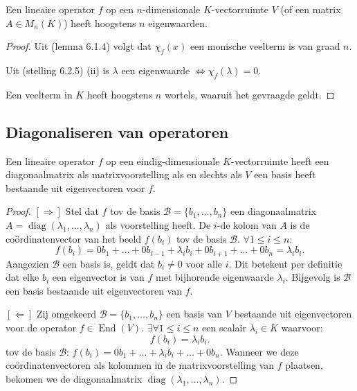 \begin{gevolg}[6.2.6]
    Een lineaire operator $f$ op een $n$-dimensionale $K$-vectorruimte $V$ (of een matrix $A \in M_n(K)$) heeft hoogstens $n$ eigenwaarden.
\end{gevolg}
\begin{proof}
    Uit (lemma 6.1.4) volgt dat \(\chi_f(x)\) een monische veelterm is van graad \(n\).

    Uit (stelling 6.2.5) (ii) is \(\lambda\) een eigenwaarde  
    \(\iff \chi_f(\lambda) = 0. \)

    Een veelterm in \(K\) heeft hoogstens \(n\) wortels, waaruit het gevraagde geldt. 

\end{proof}

\subsection{Diagonaliseren van operatoren}

\begin{stelling}[6.3.1]
    Een lineaire operator $f$ op een eindig-dimensionale $K$-vectorruimte heeft een diagonaalmatrix als matrixvoorstelling als en slechts als $V$ een basis heeft bestaande uit eigenvectoren voor $f$.
\end{stelling}
\begin{proof}
    $[\Rightarrow]$ Stel dat $f$ tov de basis $\mathcal{B} = \{b_1, \dots, b_n\}$ een diagonaalmatrix $A = \operatorname{diag}(\lambda_1, \dots, \lambda_n)$ als voorstelling heeft.
     De $i$-de kolom van $A$ is de coördinatenvector van het beeld $f(b_i)$ tov de basis $\mathcal{B}$.
    $ \forall 1 \le i \le n$:
    \[ f(b_i) = 0b_1 + \dots + 0b_{i-1} + \lambda_i b_i + 0b_{i+1} + \dots + 0b_n = \lambda_i b_i. \]
    Aangezien $\mathcal{B}$ een basis is, geldt dat $b_i \neq 0$ voor alle $i$.
    Dit betekent per definitie dat elke $b_i$ een eigenvector is van $f$ met bijhorende eigenwaarde $\lambda_i$.
    Bijgevolg is $\mathcal{B}$ een basis bestaande uit eigenvectoren van $f$.

    $[\Leftarrow]$ Zij omgekeerd $\mathcal{B} = \{b_1, \dots, b_n\}$ een basis van $V$ bestaande uit eigenvectoren voor de operator $f \in \operatorname{End}(V)$.
    $\exists \forall 1 \le i \le n$ een scalair $\lambda_i \in K$ waarvoor:
    \[ f(b_i) = \lambda_i b_i. \]
    tov de basis $\mathcal{B}$:
    \(f(b_i) = 0b_1 + \dots + \lambda_i b_i + \dots + 0b_n. \)
    Wanneer we deze coördinatenvectoren als kolommen in de matrixvoorstelling van $f$ plaatsen, bekomen we de diagonaalmatrix $\operatorname{diag}(\lambda_1, \dots, \lambda_n)$.
\end{proof}

